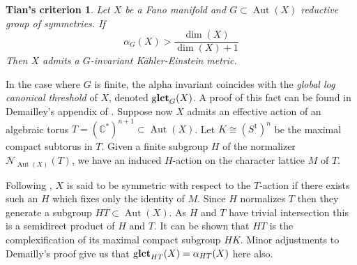 \documentclass{amsart}
\newtheorem*{ttheorem}{Tian's criterion}
\theoremstyle{definition}
\newcommand{\CC}{\mathbb{C}}
\DeclareMathOperator{\Aut}{Aut}
\DeclareMathOperator{\glct}{g\bf{lct}}
\begin{document}
\begin{ttheorem}\label{thm:tcrit}
Let \(X\) be a Fano manifold and \(G \subset \Aut(X)\) reductive group of symmetries. If
\[
\alpha_{G} (X) > \frac{\dim(X)}{\dim(X) + 1}
\]
Then \(X\) admits a \(G\)-invariant K\"ahler-Einstein metric.
\end{ttheorem}
In the case where \(G\) is finite, the alpha invariant coincides with the \textit{global log canonical threshold} of \(X\), denoted \(\glct_G(X)\). A proof of this fact can be found in Demailley's appendix of \cite{cheltsov08}. 
%
%
%
%
%
%
Suppose now \(X\) admits an effective action of an algebraic torus \(T = (\CC^*)^{n+1} \subset \Aut(X)\). Let \(K \cong (S^1)^n\) be the maximal compact subtorus in \(T\). Given a finite subgroup \(H\) of the normalizer \(\mathcal{N}_{\Aut(X)}(T)\), we have an induced \(H\)-action on the character lattice \(M\) of \(T\).

Following \cite{batyrev99}, \(X\) is said to be symmetric with respect to the \(T\)-action if there exists such an \(H\) which fixes only the identity of \(M\). Since \(H\) normalizes \(T\) then they generate a subgroup \(H T \subset \Aut(X)\). As \(H\) and \(T\) have trivial intersection this is a semidirect product of \(H\) and \(T\). It can be shown that \(HT\) is the complexification of its maximal compact subgroup \(HK\). Minor adjustments to Demailly's proof give us that \( \glct_{HT}(X) = \alpha_{HT}(X) \) here also.
\end{document}
